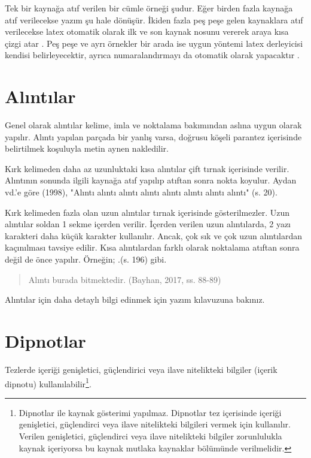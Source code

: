 \documentclass[a4paper,oneside,12pt]{report}
\begin{document}
Tek bir kaynağa atıf verilen bir cümle örneği şudur\cite{ArticleRef}. Eğer birden fazla kaynağa atıf verilecekse yazım şu hale dönüşür\cite{ArticleRef,BookRef}. İkiden fazla peş peşe gelen kaynaklara atıf verilecekse latex otomatik olarak ilk ve son kaynak nosunu vererek araya kısa çizgi atar \cite{ArticleRef,BookRef,ConferenceRef}. Peş peşe ve ayrı örnekler bir arada ise uygun yöntemi latex derleyicisi kendisi belirleyecektir, ayrıca numaralandırmayı da otomatik olarak yapacaktır \cite{ArticleRef,BookRef,ConferenceRef,ManualRef}.
\section{Alıntılar}
\label{sec:alinti}
Genel olarak alıntılar kelime, imla ve noktalama bakımından aslına uygun olarak yapılır. Alıntı yapılan parçada bir yanlış varsa, doğrusu köşeli parantez içerisinde belirtilmek koşuluyla metin aynen nakledilir.

Kırk kelimeden daha az uzunluktaki kısa alıntılar çift tırnak içerisinde verilir. Alıntının sonunda ilgili kaynağa atıf yapılıp atıftan sonra nokta koyulur. Aydan vd.’e göre (1998), "Alıntı alıntı alıntı alıntı alıntı alıntı alıntı alıntı" (s. 20).

Kırk kelimeden fazla olan uzun alıntılar tırnak içerisinde gösterilmezler. Uzun alıntılar soldan 1 sekme  içerden verilir. İçerden verilen uzun alıntılarda, 2 yazı karakteri daha küçük karakter kullanılır. Ancak, çok sık ve çok uzun alıntılardan kaçınılması tavsiye edilir. Kısa alıntılardan farklı olarak noktalama atıftan sonra değil de önce yapılır. Örneğin; .(s. 196) gibi.
\begin{quote}
	\lipsum[1-2]
	Alıntı burada bitmektedir. (Bayhan, 2017, ss. 88-89)
\end{quote}

Alıntılar için daha detaylı bilgi edinmek için yazım kılavuzuna bakınız.
\section{Dipnotlar}
\label{sec:dip}
Tezlerde içeriği genişletici, güçlendirici veya ilave nitelikteki bilgiler (içerik dipnotu) kullanılabilir\footnote{Dipnotlar ile kaynak gösterimi yapılmaz. Dipnotlar tez içerisinde içeriği genişletici, güçlendirci veya ilave nitelikteki bilgileri vermek için kullanılır. Verilen genişletici, güçlendirci veya ilave nitelikteki bilgiler zorunlulukla kaynak içeriyorsa bu kaynak mutlaka kaynaklar bölümünde verilmelidir.}.
\end{document}
